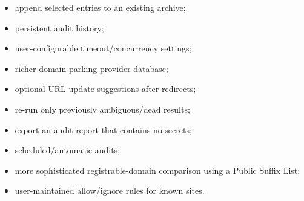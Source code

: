 \documentclass[
  letterpaper,
]{article}
\providecommand{\tightlist}{%
  \setlength{\itemsep}{0pt}\setlength{\parskip}{0pt}}
\begin{document}
\begin{itemize}
\tightlist
\item
  append selected entries to an existing archive;
\item
  persistent audit history;
\item
  user-configurable timeout/concurrency settings;
\item
  richer domain-parking provider database;
\item
  optional URL-update suggestions after redirects;
\item
  re-run only previously ambiguous/dead results;
\item
  export an audit report that contains no secrets;
\item
  scheduled/automatic audits;
\item
  more sophisticated registrable-domain comparison using a Public Suffix List;
\item
  user-maintained allow/ignore rules for known sites.
\end{itemize}
\end{document}
